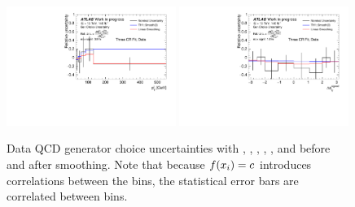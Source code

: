 \begin{figure}[t]
  \includegraphics[width=0.49\textwidth]{plots/diffx/genchoice/data/sys_errors_lep_pt_generator_choice_3cr.pdf}
  \includegraphics[width=0.49\textwidth]{plots/diffx/genchoice/data/sys_errors_lepgam_dphi_generator_choice_3cr.pdf}
  \caption{Data QCD generator choice uncertainties with \mjj, \ptjj, \dphisigned, \mly, \leppt, and \lepgamdphi before and after smoothing. Note that because $f(x_i)=c$ introduces correlations between the bins, the statistical error bars are correlated between bins.}
  \label{fig:vbswy:genchoicedata}
\end{figure}

